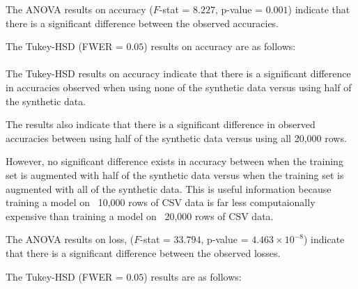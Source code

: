 \normalsize

\vspace{0.7em}

The ANOVA results on accuracy ($F$-stat = $8.227$, p-value = $0.001$) indicate that there is a significant difference 
between the observed accuracies.

The Tukey-HSD (FWER = $0.05$) results on accuracy are as follows: \\

\noindent
{} \\

The Tukey-HSD results on accuracy indicate that there is a significant difference in accuracies observed when using none of the synthetic data
versus using half of the synthetic data. 

The results also indicate that there is a significant difference in observed accuracies between using half of the synthetic
data versus using all 20,000 rows. 

However, no significant difference exists in accuracy between when the training set is augmented with half of the synthetic data
versus when the training set is augmented with all of the synthetic data. This is useful information because training a model on ~10,000 rows
of CSV data is far less computaionally expensive than training a model on ~20,000 rows of CSV data.

The ANOVA results on loss,
($F$-stat = $33.794$, p-value = $4.463 \times 10^{-8}$) indicate that there is a significant difference between 
the observed losses.

The Tukey-HSD (FWER = $0.05$) results are as follows: \\

\noindent
{} \\

